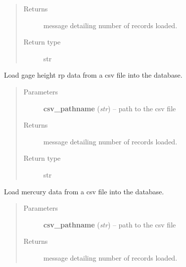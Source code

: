 \documentclass[letterpaper,10pt,english]{sphinxmanual}
\begin{document}
\begin{fulllineitems}
\begin{fulllineitems}
\begin{quote}
\begin{description}
\begin{itemize}
\end{itemize}

\item[{Returns}] \leavevmode
message detailing number of records loaded.

\item[{Return type}] \leavevmode
str

\end{description}\end{quote}

\end{fulllineitems}


\begin{fulllineitems}
\label{modules:webb_utils.upload_data.UploadData.load_gage_ht_rp_data}
Load gage height rp data from a csv file into the database.
\begin{quote}\begin{description}
\item[{Parameters}] \leavevmode
\textbf{csv\_pathname} (\emph{str}) -- path to the csv file

\item[{Returns}] \leavevmode
message detailing number of records loaded.

\item[{Return type}] \leavevmode
str

\end{description}\end{quote}

\end{fulllineitems}


\begin{fulllineitems}
\label{modules:webb_utils.upload_data.UploadData.load_mercury_data}
Load mercury data from a csv file into the database.
\begin{quote}\begin{description}
\item[{Parameters}] \leavevmode
\textbf{csv\_pathname} (\emph{str}) -- path to the csv file

\item[{Returns}] \leavevmode
message detailing number of records loaded.


\end{description}
\end{quote}
\end{fulllineitems}
\end{fulllineitems}
\end{document}
